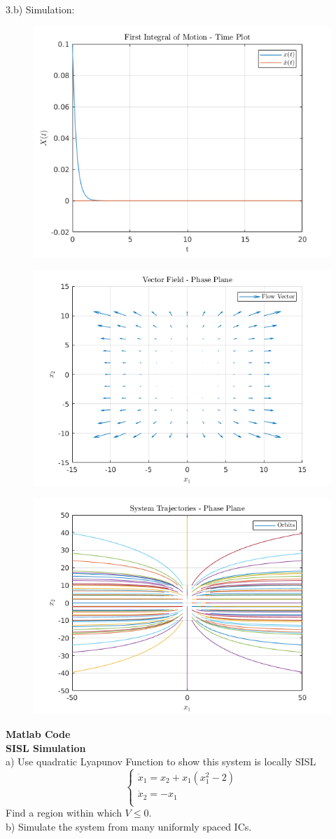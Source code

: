 \documentclass{homeworg}
\begin{document}
3.b) Simulation:
\begin{figure}[h]
  \includegraphics[width=.6\textwidth]{fig01.png}
  \centering
\end{figure}
\begin{figure}[h]
  \includegraphics[width=.6\textwidth]{fig02.png}
  \centering
\end{figure}
\begin{figure}[h]
  \includegraphics[width=.6\textwidth]{fig03.png}
  \centering
\end{figure}
\newpage
\noindent
\textbf{Matlab Code}\\




\exercise
\noindent
\textbf{SISL Simulation}\\
a) Use quadratic Lyapunov Function to show this system is locally SISL
\begin{equation*}
  \begin{cases}
    \dot{x}_1 = x_2 + x_1 (x_1^2 -2)\\
    \dot{x}_2 = -x_1\\
  \end{cases}
\end{equation*}
Find a region within which \(V \leq 0\).\\
b) Simulate the system from many uniformly spaced ICs.
\end{document}
